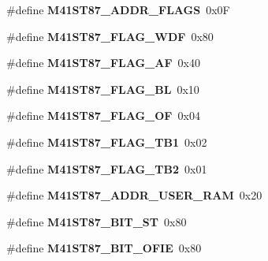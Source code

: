 \begin{DoxyCompactItemize}
\#define {\bfseries M41\+S\+T87\+\_\+\+A\+D\+D\+R\+\_\+\+F\+L\+A\+GS}~0x0F
\item 
\mbox{\label{arm_2altera-cyclone-v_2rtc_2rtc_8c_aca4b3ccbb36475775b3c5fb83fc79f94}} 
\#define {\bfseries M41\+S\+T87\+\_\+\+F\+L\+A\+G\+\_\+\+W\+DF}~0x80
\item 
\mbox{\label{arm_2altera-cyclone-v_2rtc_2rtc_8c_a1d7852f89b0cd614c002f7607ea44a75}} 
\#define {\bfseries M41\+S\+T87\+\_\+\+F\+L\+A\+G\+\_\+\+AF}~0x40
\item 
\mbox{\label{arm_2altera-cyclone-v_2rtc_2rtc_8c_a6b326138b3596a5c16cd249ddf387ad8}} 
\#define {\bfseries M41\+S\+T87\+\_\+\+F\+L\+A\+G\+\_\+\+BL}~0x10
\item 
\mbox{\label{arm_2altera-cyclone-v_2rtc_2rtc_8c_ae7469910407d9a1506f202049a5a2f95}} 
\#define {\bfseries M41\+S\+T87\+\_\+\+F\+L\+A\+G\+\_\+\+OF}~0x04
\item 
\mbox{\label{arm_2altera-cyclone-v_2rtc_2rtc_8c_aee244490a7265802b609d1ed9d0a3c64}} 
\#define {\bfseries M41\+S\+T87\+\_\+\+F\+L\+A\+G\+\_\+\+T\+B1}~0x02
\item 
\mbox{\label{arm_2altera-cyclone-v_2rtc_2rtc_8c_ac24dd4f3332520a1271d6613d01b6cb7}} 
\#define {\bfseries M41\+S\+T87\+\_\+\+F\+L\+A\+G\+\_\+\+T\+B2}~0x01
\item 
\mbox{\label{arm_2altera-cyclone-v_2rtc_2rtc_8c_a1f32e3e74507321488bb42fb3592e7dd}} 
\#define {\bfseries M41\+S\+T87\+\_\+\+A\+D\+D\+R\+\_\+\+U\+S\+E\+R\+\_\+\+R\+AM}~0x20
\item 
\mbox{\label{arm_2altera-cyclone-v_2rtc_2rtc_8c_a5e1f56a78c5a016c2614ae5c67a1feb3}} 
\#define {\bfseries M41\+S\+T87\+\_\+\+B\+I\+T\+\_\+\+ST}~0x80
\item 
\mbox{\label{arm_2altera-cyclone-v_2rtc_2rtc_8c_ab21dbfb0505c2f6a7c897598b66a5298}} 
\#define {\bfseries M41\+S\+T87\+\_\+\+B\+I\+T\+\_\+\+O\+F\+IE}~0x80

\end{DoxyCompactItemize}
